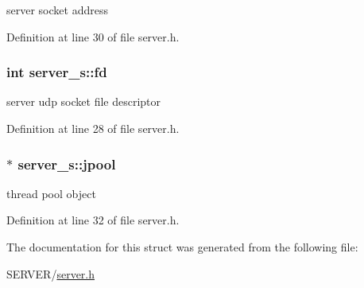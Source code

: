 server socket address 



Definition at line 30 of file server.\-h.

\hypertarget{structserver__s_a6129acbc6b313f77efeb488754f559ec}{
\subsubsection[{fd}]{\setlength{\rightskip}{0pt plus 5cm}int server\-\_\-s\-::fd}}\label{structserver__s_a6129acbc6b313f77efeb488754f559ec}


server udp socket file descriptor 



Definition at line 28 of file server.\-h.

\hypertarget{structserver__s_ac45d9f57c1cf8b4841843284d319072b}{
\subsubsection[{jpool}]{$\ast$ server\-\_\-s\-::jpool}}\label{structserver__s_ac45d9f57c1cf8b4841843284d319072b}


thread pool object 



Definition at line 32 of file server.\-h.



The documentation for this struct was generated from the following file\-:\begin{DoxyCompactItemize}
\item 
S\-E\-R\-V\-E\-R/\hyperlink{server_8h}{server.\-h}\end{DoxyCompactItemize}
